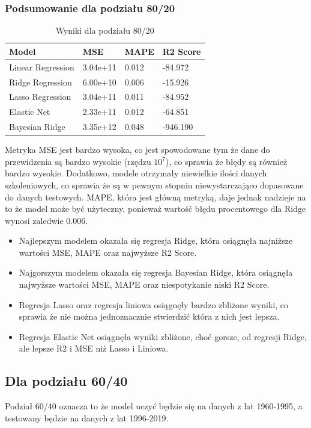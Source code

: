 \documentclass[11pt]{article}
\begin{document}
\subsubsection{Podsumowanie dla podziału 80/20}
\begin{table}[H]
        \centering
        \begin{tabular}{|l|l|l|l|}
        \hline
        Model & MSE & MAPE & R2 Score \\ \hline
        Linear Regression & 3.04e+11 & 0.012 & -84.972 \\ \hline
        Ridge Regression & 6.00e+10 & 0.006 & -15.926 \\ \hline
        Lasso Regression & 3.04e+11 & 0.011 & -84.952 \\ \hline
        Elastic Net & 2.33e+11 & 0.012 & -64.851 \\ \hline
        Bayesian Ridge & 3.35e+12 & 0.048 & -946.190 \\ \hline
        \end{tabular}
        \caption{Wyniki dla podziału 80/20}
\end{table}
Metryka MSE jest bardzo wysoka, co jest spowodowane tym że dane do przewidzenia są bardzo wysokie (rzędzu $10^7$), co sprawia że błędy są również bardzo wysokie.
Dodatkowo, modele otrzymały niewielkie ilości danych szkoleniowych, co sprawia że są w pewnym stopniu niewystarczająco dopasowane do danych testowych.
MAPE, która jest główną metryką, daje jednak nadzieje na to że model może być użyteczny, ponieważ wartość błędu procentowego dla Ridge wynosi zaledwie 0.006.
\begin{itemize}
        \item Najlepszym modelem okazała się regresja Ridge, która osiągnęła najniższe wartości MSE, MAPE oraz najwyższe R2 Score.
        \item Najgorszym modelem okazała się regresja Bayesian Ridge, która osiągnęła najwyższe wartości MSE, MAPE oraz niespotykanie niski R2 Score.
        \item Regresja Lasso oraz regresja liniowa osiągnęły bardzo zbliżone wyniki, co sprawia że nie można jednoznacznie stwierdzić która z nich jest lepsza.
        \item Regresja Elastic Net osiągnęła wyniki zbliżone, choć gorsze, od regresji Ridge, ale lepsze R2 i MSE niż Lasso i Liniowa.
\end{itemize}
\subsection{Dla podziału 60/40}
Podział 60/40 oznacza to że model uczyć będzie się na danych z lat 1960-1995, a testowany będzie na danych z lat 1996-2019.
\end{document}
